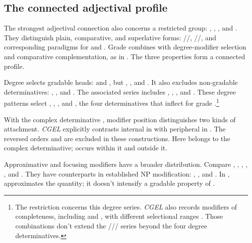 \documentclass[12pt]{article}
\begin{document}
\subsection{The connected adjectival profile}\label{sec:adjectival-profile}

The strongest adjectival connection also concerns a restricted group: , , , and . They distinguish plain, comparative, and superlative forms: /\allowbreak{}/\allowbreak{}, /\allowbreak{}/\allowbreak{}, and corresponding paradigms for  and  \citep[391--395]{huddleston2002}. Grade combines with degree-modifier selection and comparative complementation, as in . The three properties form a connected profile.

Degree  selects gradable heads:  and , but , , and . It also excludes non-gradable determinatives: , , and . The associated series includes , , , and . These degree patterns select , , , and , the four determinatives that inflect for grade \citep[393--395, 431--432]{huddleston2002}.\footnote{The restriction concerns this degree series. \textit{CGEL} also records modifiers of completeness, including  and , with different selectional ranges \citep[432]{huddleston2002}. Those combinations don't extend the /// series beyond the four degree determinatives.}

With the complex determinative , modifier position distinguishes two kinds of attachment. \textit{CGEL} explicitly contrasts internal  in  with peripheral  in  \citep[p.~392, (61)]{huddleston2002}. The reversed orders  and  are excluded in these constructions. Here  belongs to the complex determinative;  occurs within it and  outside it.

Approximative and focusing modifiers have a broader distribution. Compare , , , , , and . They have counterparts in established NP modification: , , and . In ,  approximates the quantity; it doesn't intensify a gradable property of .
\end{document}
